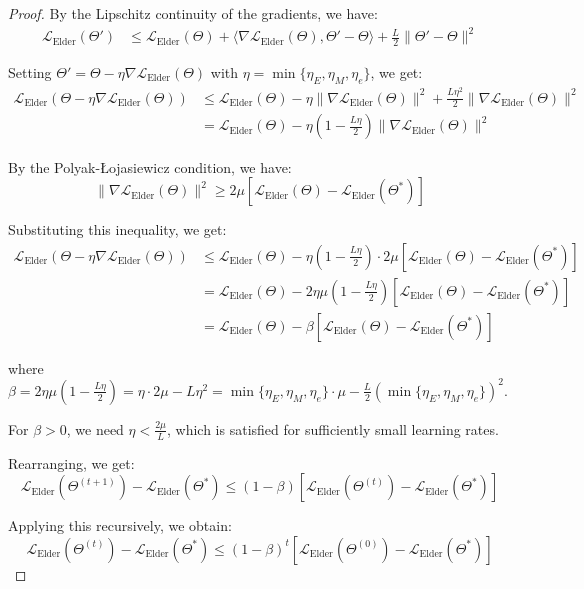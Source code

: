 \begin{proof}
By the Lipschitz continuity of the gradients, we have:
\begin{align}
\mathcal{L}_{\text{Elder}}(\Theta') &\leq \mathcal{L}_{\text{Elder}}(\Theta) + \langle \nabla \mathcal{L}_{\text{Elder}}(\Theta), \Theta' - \Theta \rangle + \frac{L}{2}\|\Theta' - \Theta\|^2
\end{align}

Setting $\Theta' = \Theta - \eta \nabla \mathcal{L}_{\text{Elder}}(\Theta)$ with $\eta = \min\{\eta_E, \eta_M, \eta_e\}$, we get:
\begin{align}
\mathcal{L}_{\text{Elder}}(\Theta - \eta \nabla \mathcal{L}_{\text{Elder}}(\Theta)) &\leq \mathcal{L}_{\text{Elder}}(\Theta) - \eta\|\nabla \mathcal{L}_{\text{Elder}}(\Theta)\|^2 + \frac{L\eta^2}{2}\|\nabla \mathcal{L}_{\text{Elder}}(\Theta)\|^2 \\
&= \mathcal{L}_{\text{Elder}}(\Theta) - \eta(1 - \frac{L\eta}{2})\|\nabla \mathcal{L}_{\text{Elder}}(\Theta)\|^2
\end{align}

By the Polyak-Łojasiewicz condition, we have:
\begin{equation}
\|\nabla \mathcal{L}_{\text{Elder}}(\Theta)\|^2 \geq 2\mu[\mathcal{L}_{\text{Elder}}(\Theta) - \mathcal{L}_{\text{Elder}}(\Theta^*)]
\end{equation}

Substituting this inequality, we get:
\begin{align}
\mathcal{L}_{\text{Elder}}(\Theta - \eta \nabla \mathcal{L}_{\text{Elder}}(\Theta)) &\leq \mathcal{L}_{\text{Elder}}(\Theta) - \eta(1 - \frac{L\eta}{2}) \cdot 2\mu [\mathcal{L}_{\text{Elder}}(\Theta) - \mathcal{L}_{\text{Elder}}(\Theta^*)] \\
&= \mathcal{L}_{\text{Elder}}(\Theta) - 2\eta\mu(1 - \frac{L\eta}{2})[\mathcal{L}_{\text{Elder}}(\Theta) - \mathcal{L}_{\text{Elder}}(\Theta^*)] \\
&= \mathcal{L}_{\text{Elder}}(\Theta) - \beta [\mathcal{L}_{\text{Elder}}(\Theta) - \mathcal{L}_{\text{Elder}}(\Theta^*)]
\end{align}

where $\beta = 2\eta\mu(1 - \frac{L\eta}{2}) = \eta \cdot 2\mu - L\eta^2 = \min\{\eta_E, \eta_M, \eta_e\} \cdot \mu - \frac{L}{2}(\min\{\eta_E, \eta_M, \eta_e\})^2$.

For $\beta > 0$, we need $\eta < \frac{2\mu}{L}$, which is satisfied for sufficiently small learning rates.

Rearranging, we get:
\begin{equation}
\mathcal{L}_{\text{Elder}}(\Theta^{(t+1)}) - \mathcal{L}_{\text{Elder}}(\Theta^*) \leq (1 - \beta)[\mathcal{L}_{\text{Elder}}(\Theta^{(t)}) - \mathcal{L}_{\text{Elder}}(\Theta^*)]
\end{equation}

Applying this recursively, we obtain:
\begin{equation}
\mathcal{L}_{\text{Elder}}(\Theta^{(t)}) - \mathcal{L}_{\text{Elder}}(\Theta^*) \leq (1 - \beta)^t [\mathcal{L}_{\text{Elder}}(\Theta^{(0)}) - \mathcal{L}_{\text{Elder}}(\Theta^*)]
\end{equation}
\end{proof}

